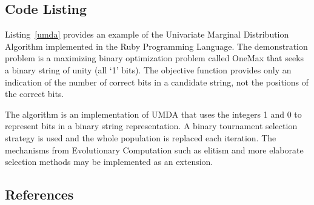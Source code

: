 \subsection{Code Listing}
Listing~\ref{umda} provides an example of the Univariate Marginal Distribution Algorithm implemented in the Ruby Programming Language. 
The demonstration problem is a maximizing binary optimization problem called OneMax that seeks a binary string of unity (all `1' bits). The objective function provides only an indication of the number of correct bits in a candidate string, not the positions of the correct bits.

The algorithm is an implementation of UMDA that uses the integers 1 and 0 to represent bits in a binary string representation. A binary tournament selection strategy is used and the whole population is replaced each iteration. The mechanisms from Evolutionary Computation such as elitism and more elaborate selection methods may be implemented as an extension.



\subsection{References}

